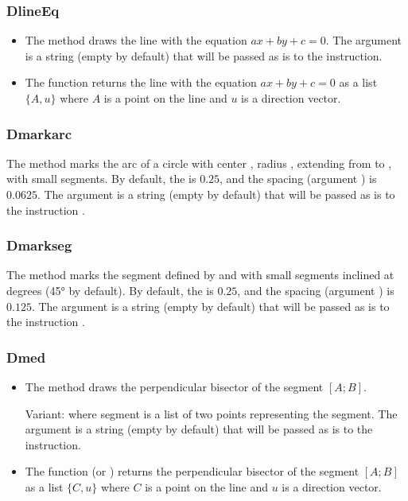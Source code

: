 \subsubsection{DlineEq}
\begin{itemize}
    \item The  method draws the line with the equation \(ax+by+c=0\). The  argument is a string (empty by default) that will be passed as is to the \drawcmd instruction. \arguScale
    \item The  function returns the line with the equation \(ax+by+c=0\) as a list $\{A,u\}$ where $A$ is a point on the line and $u$ is a direction vector.
\end{itemize}

\subsubsection{Dmarkarc}
The method  marks the arc of a circle with center , radius , extending from  to , with  small segments. By default, the  is $0.25$, and the spacing (argument ) is $0.0625$. The argument  is a string (empty by default) that will be passed as is to the instruction \drawcmd.

\subsubsection{Dmarkseg}
The method  marks the segment defined by  and  with  small segments inclined at  degrees (45° by default). By default, the  is $0.25$, and the spacing (argument ) is $0.125$. The argument  is a string (empty by default) that will be passed as is to the instruction \drawcmd.

\subsubsection{Dmed}
\begin{itemize}
    \item The  method draws the perpendicular bisector of the segment $[A;B]$.

Variant:  where segment is a list of two points representing the segment. The  argument is a string (empty by default) that will be passed as is to the \drawcmd instruction. \arguScale

     \item The function  (or ) returns the perpendicular bisector of the segment $[A;B]$ as a list $\{C,u\}$ where $C$ is a point on the line and $u$ is a direction vector.
\end{itemize}

